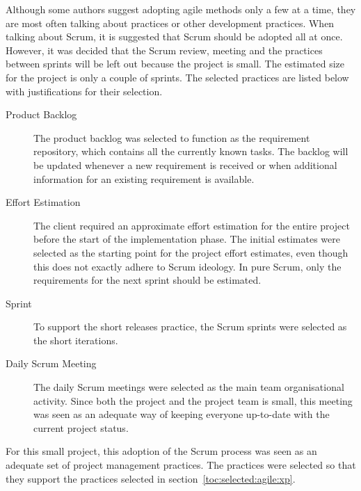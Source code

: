 Although some authors suggest adopting agile methods only a few at a 
time, they are most often talking about  practices or other 
development practices. When talking about Scrum, it is suggested that 
Scrum should be adopted all at once. However, it was decided that the 
Scrum review, meeting and the practices between sprints will be left 
out because the project is small. The estimated size for the project 
is only a couple of sprints. The selected practices are listed below 
with justifications for their selection.

\begin{description}

\item[Product Backlog] The product backlog was selected to function as 
the requirement repository, which contains all the currently known 
tasks. The backlog will be updated whenever a new requirement is 
received or when additional information for an existing requirement is 
available.

\item[Effort Estimation] The client required an approximate effort 
estimation for the entire project before the start of the 
implementation phase. The initial estimates were selected as the 
starting point for the project effort estimates, even though this does 
not exactly adhere to Scrum ideology. In pure Scrum, only the 
requirements for the next sprint should be estimated.

\item[Sprint] To support the  short releases practice, the
Scrum sprints were selected as the short iterations.

\item[Daily Scrum Meeting] The daily Scrum meetings were selected as
the main team organisational activity. Since both the project and the
project team is small, this meeting was seen as an adequate way of
keeping everyone up-to-date with the current project status.

\end{description}

For this small project, this adoption of the Scrum process was seen as 
an adequate set of project management practices. The practices were
selected so that they support the  practices selected in
section~\ref{toc:selected:agile:xp}.


